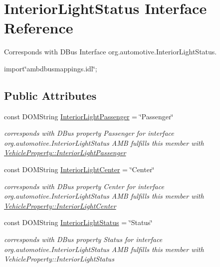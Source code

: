 \hypertarget{interfaceInteriorLightStatus}{\section{Interior\+Light\+Status Interface Reference}
\label{interfaceInteriorLightStatus}
}


Corresponds with D\+Bus Interface org.\+automotive.\+Interior\+Light\+Status.  




{\ttfamily import\char`\"{}ambdbusmappings.\+idl\char`\"{};}

\subsection*{Public Attributes}
\begin{DoxyCompactItemize}
\item 
const D\+O\+M\+String \hyperlink{interfaceInteriorLightStatus_abf8320eb6b0e7c6b60bbc90d91760832}{Interior\+Light\+Passenger} = \char`\"{}Passenger\char`\"{}
\begin{DoxyCompactList}\small\item\em corresponds with D\+Bus property Passenger for interface org.\+automotive.\+Interior\+Light\+Status A\+M\+B fulfills this member with \hyperlink{classVehicleProperty_af60682429c3b2c7517715801d4ac0f92}{Vehicle\+Property\+::\+Interior\+Light\+Passenger} \end{DoxyCompactList}\item 
\hypertarget{interfaceInteriorLightStatus_a65f623a6bfcf7dd09b8634ea2bd28238}{const D\+O\+M\+String \hyperlink{interfaceInteriorLightStatus_a65f623a6bfcf7dd09b8634ea2bd28238}{Interior\+Light\+Center} = \char`\"{}Center\char`\"{}}\label{interfaceInteriorLightStatus_a65f623a6bfcf7dd09b8634ea2bd28238}

\begin{DoxyCompactList}\small\item\em corresponds with D\+Bus property Center for interface org.\+automotive.\+Interior\+Light\+Status A\+M\+B fulfills this member with \hyperlink{classVehicleProperty_a86c0bb4ab676e06e3c807d90c92e7240}{Vehicle\+Property\+::\+Interior\+Light\+Center} \end{DoxyCompactList}\item 
\hypertarget{interfaceInteriorLightStatus_a93968b6203be5a851eece2ba7d94efb3}{const D\+O\+M\+String \hyperlink{interfaceInteriorLightStatus_a93968b6203be5a851eece2ba7d94efb3}{Interior\+Light\+Status} = \char`\"{}Status\char`\"{}}\label{interfaceInteriorLightStatus_a93968b6203be5a851eece2ba7d94efb3}

\begin{DoxyCompactList}\small\item\em corresponds with D\+Bus property Status for interface org.\+automotive.\+Interior\+Light\+Status A\+M\+B fulfills this member with Vehicle\+Property\+::\+Interior\+Light\+Status \end{DoxyCompactList}\end{DoxyCompactItemize}


